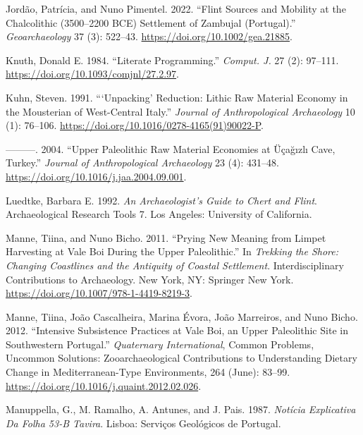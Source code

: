 \documentclass[
  a4paper,
  DIV=11,
  numbers=noendperiod]{scrreprt}
\newlength{\cslhangindent}
\newenvironment{CSLReferences}[2] %
 {\begin{list}{}{%
  \setlength{\itemindent}{0pt}
  \setlength{\leftmargin}{0pt}
  \setlength{\parsep}{0pt}
  \ifodd #1
   \setlength{\leftmargin}{\cslhangindent}
   \setlength{\itemindent}{-1\cslhangindent}
  \fi
  \setlength{\itemsep}{#2\baselineskip}}}
 {\end{list}}
\begin{document}
\begin{CSLReferences}{1}{0}
Jordão, Patrícia, and Nuno Pimentel. 2022. {``Flint Sources and Mobility
at the {Chalcolithic} (3500--2200 {BCE}) Settlement of {Zambujal}
({Portugal}).''} \emph{Geoarchaeology} 37 (3): 522--43.
\url{https://doi.org/10.1002/gea.21885}.

Knuth, Donald E. 1984. {``Literate Programming.''} \emph{Comput. J.} 27
(2): 97--111. \url{https://doi.org/10.1093/comjnl/27.2.97}.

Kuhn, Steven. 1991. {``{`{Unpacking}'} Reduction: {Lithic} Raw Material
Economy in the Mousterian of West-Central {Italy}.''} \emph{Journal of
Anthropological Archaeology} 10 (1): 76--106.
\url{https://doi.org/10.1016/0278-4165(91)90022-P}.

---------. 2004. {``Upper {Paleolithic} Raw Material Economies at
{{Ü}{ç}a{ğ}{ı}zl{ı}} Cave, {Turkey}.''} \emph{Journal of Anthropological
Archaeology} 23 (4): 431--48.
\url{https://doi.org/10.1016/j.jaa.2004.09.001}.

Luedtke, Barbara E. 1992. \emph{An {Archaeologist}'s {Guide} to {Chert}
and {Flint}}. Archaeological {Research Tools} 7. Los Angeles: University
of California.

Manne, Tiina, and Nuno Bicho. 2011. {``Prying {New Meaning} from {Limpet
Harvesting} at {Vale Boi During} the {Upper Paleolithic}.''} In
\emph{Trekking the {Shore}: {Changing Coastlines} and the {Antiquity} of
{Coastal Settlement}}. Interdisciplinary {Contributions} to
{Archaeology}. New York, NY: Springer New York.
\url{https://doi.org/10.1007/978-1-4419-8219-3}.

Manne, Tiina, João Cascalheira, Marina Évora, João Marreiros, and Nuno
Bicho. 2012. {``Intensive Subsistence Practices at {Vale Boi}, an {Upper
Paleolithic} Site in Southwestern {Portugal}.''} \emph{Quaternary
International}, Common {Problems}, {Uncommon Solutions}:
{Zooarchaeological Contributions} to {Understanding Dietary Change} in
{Mediterranean-Type Environments}, 264 (June): 83--99.
\url{https://doi.org/10.1016/j.quaint.2012.02.026}.

Manuppella, G., M. Ramalho, A. Antunes, and J. Pais. 1987.
\emph{Not{í}cia Explicativa Da Folha 53-{B Tavira}}. Lisboa: Servi{ç}os
Geol{ó}gicos de Portugal.


\end{CSLReferences}
\end{document}
